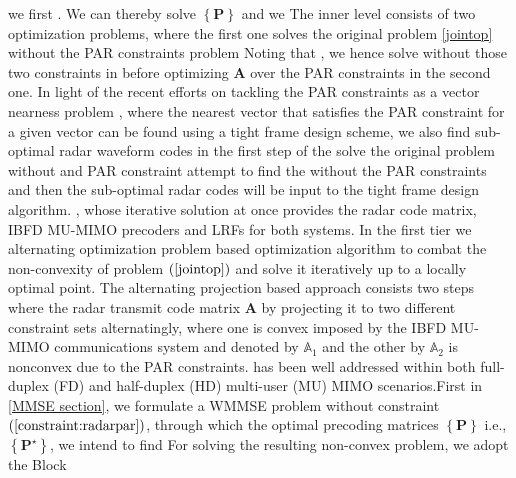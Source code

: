\documentclass[10pt,journal]{IEEEtran}
\newcommand{\paren}[1]{\left({#1}\right)}
\newcommand{\braces}[1]{{\left\{ {#1}\right\}}}
\theoremstyle{definition}
\begin{document}
	
	
	\iffalse
	we first . We can thereby solve $\braces{\mathbf{P}}$  and we The inner level consists of two optimization problems, where the first one solves the original problem \eqref{jointop} without the PAR constraints  problem Noting that , we hence solve  without those two constraints in  before optimizing $\mathbf{A}$ over the PAR constraints in the second one. In light of the recent efforts on tackling the PAR constraints as a vector nearness problem \cite{NaghshTSP2017,nearestvector}, where the nearest vector that satisfies the PAR constraint for a given vector can be found using a tight frame design scheme, we also find sub-optimal radar waveform codes in the first step of the  solve the original problem without and PAR constraint attempt to find the  without the PAR constraints and then the sub-optimal radar codes will be input to the tight frame design algorithm.  , whose iterative solution at once provides the radar code matrix, IBFD MU-MIMO precoders and LRFs for both systems. In the first tier we alternating optimization problem  based optimization algorithm to combat the non-convexity of problem $\paren{\mathrm{\ref{jointop}}}$ and solve it iteratively up to a locally optimal point. The alternating projection based approach consists two steps where the radar transmit code matrix $\mathbf{A}$ by projecting it to two different constraint sets alternatingly, where one is convex imposed by the IBFD MU-MIMO communications system and denoted by $\mathbb{A}_1$ and the other by $\mathbb{A}_2$ is nonconvex due to the PAR constraints. has been well addressed within both full-duplex (FD) and half-duplex (HD) multi-user (MU) MIMO scenarios.First in \ref{MMSE section}, we formulate a WMMSE problem without constraint $\paren{\mathrm{\ref{constraint:radarpar}}}$, through which the optimal precoding matrices $\braces{\mathbf{P}}$ i.e., $\braces{\mathbf{P}^\star}$,  we intend to find 
	For solving the resulting non-convex problem, we adopt the Block
\end{document}
